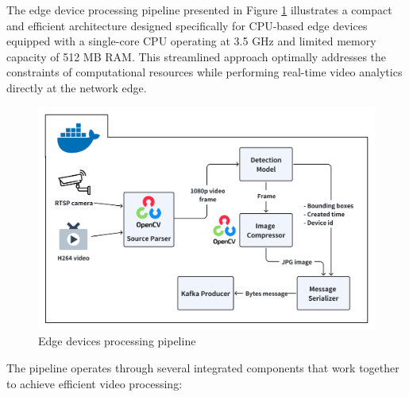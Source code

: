The edge device processing pipeline presented in Figure \ref{fig:edges} illustrates a compact and efficient architecture designed specifically for CPU-based edge devices equipped with a single-core CPU operating at 3.5 GHz and limited memory capacity of 512 MB RAM. This streamlined approach optimally addresses the constraints of computational resources while performing real-time video analytics directly at the network edge.

\begin{figure}[htbp]
    \centering
    \includegraphics[width=1\textwidth]{Figure/edges.png}
    \caption{Edge devices processing pipeline}
    \label{fig:edges}
\end{figure}

The pipeline operates through several integrated components that work together to achieve efficient video processing:

